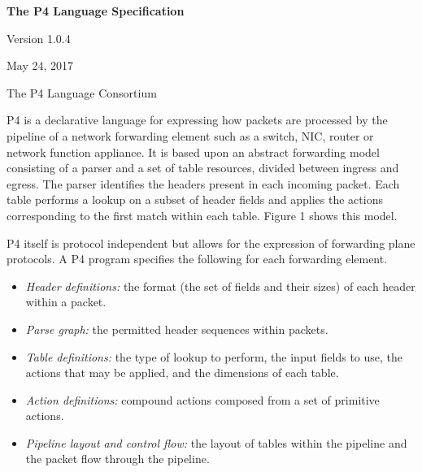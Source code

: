 \documentclass[12pt]{article}
\begin{document}
\vspace{2cm}

\centerline{\sffamily\bfseries\huge The P4 Language Specification}
\vspace{3mm}
\centerline{\sffamily\Large Version 1.0.4}
\vspace{3mm}
\centerline{\sffamily\large May 24, 2017}
\vspace{8mm}
\centerline{\sffamily\large The P4 Language Consortium}

\date{May 24, 2017}
\thispagestyle{firstpagestyle}


P4 is a declarative language for expressing how packets are processed by the 
pipeline of a network forwarding element such as a switch, NIC, router or 
network function appliance. It is based upon an abstract forwarding model 
consisting of a parser and a set of \matchaction table resources, divided 
between ingress and egress. The parser identifies the headers present in 
each incoming packet. Each \matchaction table performs a lookup on a subset 
of header fields and applies the actions corresponding to the first match 
within each table. Figure 1 shows this model.

P4 itself is protocol independent but allows for the expression of forwarding 
plane protocols. A P4 program specifies the following for each forwarding 
element.

\begin{itemize}
\item
\textit{Header definitions:} the format (the set of fields and their
sizes) of each header within a packet.
\item
\textit{Parse graph:} the permitted header sequences within packets.
\item
\textit{Table definitions:} the type of lookup to perform, the input
fields to use, the actions that may be applied, and the dimensions of
each table.
\item
\textit{Action definitions:} compound actions composed from a set of
primitive actions.
\item
\textit{Pipeline layout and control flow:} the layout of tables within
the pipeline and the packet flow through the pipeline.
\end{itemize}
\end{document}
